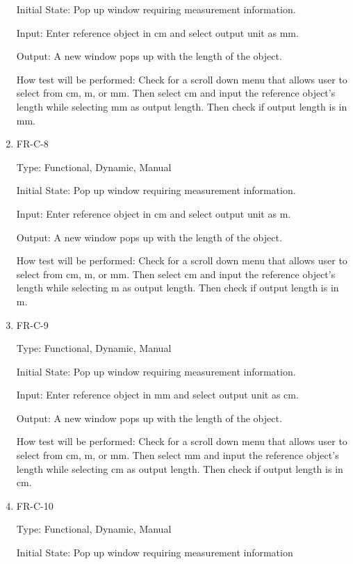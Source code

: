 \documentclass[12pt, titlepage]{article}
\begin{document}
\begin{enumerate}
					Initial State: Pop up window requiring measurement information.
					
					Input: Enter reference object in cm and select output unit as mm.
					
					Output: A new window pops up with the length of the object.
					
					How test will be performed: Check for a scroll down menu that allows user to select from cm, m, or mm. Then select cm and input the reference object's length while selecting mm as output length. Then check if output length is in mm.
				
				    \item{FR-C-8\\}
					
					Type: Functional, Dynamic, Manual
					
					Initial State: Pop up window requiring measurement information.
					
					Input: Enter reference object in cm and select output unit as m.
					
					Output: A new window pops up with the length of the object.
					
					How test will be performed: Check for a scroll down menu that allows user to select from cm, m, or mm. Then select cm and input the reference object's length while selecting m as output length. Then check if output length is in m.
				
				\item{FR-C-9\\}
					
					Type: Functional, Dynamic, Manual
					
					Initial State: Pop up window requiring measurement information.
					
					Input: Enter reference object in mm and select output unit as cm.
					
					Output: A new window pops up with the length of the object.
					
					How test will be performed: Check for a scroll down menu that allows user to select from cm, m, or mm. Then select mm and input the reference object's length while selecting cm as output length. Then check if output length is in cm.
					
				\item{FR-C-10\\}
					
					Type: Functional, Dynamic, Manual
					
					Initial State: Pop up window requiring measurement information
					

\end{enumerate}
\end{document}
